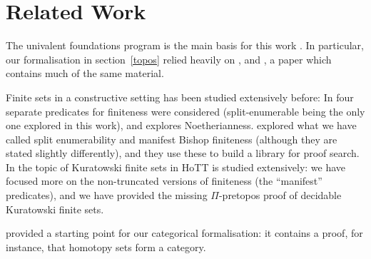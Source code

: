 \chapter{Related Work}
The univalent foundations program is the main basis for this work
\cite{hottbook}.
In particular, our formalisation in section~\ref{topos} relied heavily on
\cite[chapter 10]{hottbook}, and \cite{rijkeSetsHomotopyType2015}, a paper which
contains much of the same material.

Finite sets in a constructive setting has been studied extensively before:
In \cite{coquandConstructivelyFinite2010} four separate predicates for
finiteness were considered (split-enumerable being the only one explored in this
work), and \cite{firsovVariationsNoetherianness2016} explores Noetherianness.
\cite{firsovDependentlyTypedProgramming2015} explored what we have called split
enumerability and manifest Bishop finiteness (although they are stated slightly
differently), and they use these to build a library for proof search.
In \cite{fruminFiniteSetsHomotopy2018} the topic of Kuratowski finite sets in
HoTT is studied extensively: we have focused more on the non-truncated versions
of finiteness (the ``manifest'' predicates), and we have provided the missing
\(\Pi\)-pretopos proof of decidable Kuratowski finite sets.

\cite{iversenUnivalentCategoriesFormalization2018} provided a starting point for
our categorical formalisation: it contains a proof, for instance, that homotopy
sets form a category.


